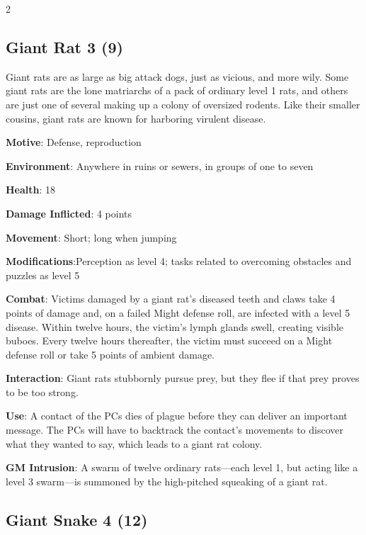 \begin{multicols}{2}
\subsection{Giant Rat	3 (9)}

Giant rats are as large as big attack dogs, just as vicious, and more wily. Some giant rats are the lone matriarchs of a pack of ordinary level 1 rats, and others are just one of several making up a colony of oversized rodents. Like their smaller cousins, giant rats are known for harboring virulent disease.

\textbf{Motive}: Defense, reproduction

\textbf{Environment}: Anywhere in ruins or sewers, in groups of one to seven 

\textbf{Health}: 18

\textbf{Damage Inflicted}: 4 points

\textbf{Movement}: Short; long when jumping

\textbf{Modifications}:Perception as level 4; tasks related to overcoming obstacles and puzzles as level 5

\textbf{Combat}: Victims damaged by a giant rat’s diseased teeth and claws take 4 points of damage and, on a failed Might defense roll, are infected with a level 5 disease. Within twelve hours, the victim’s lymph glands swell, creating visible buboes. Every twelve hours thereafter, the victim must succeed on a Might defense roll or take 5 points of ambient damage.

\textbf{Interaction}: Giant rats stubbornly pursue prey, but they flee if that prey proves to be too strong.

\textbf{Use}: A contact of the PCs dies of plague before they can deliver an important message. The PCs will have to backtrack the contact’s movements to discover what they wanted to say, which leads to a giant rat colony.

\textbf{GM Intrusion}: A swarm of twelve ordinary rats—each level 1, but acting like a level 3 swarm—is summoned by the high-pitched squeaking of a giant rat.

\subsection{Giant Snake 4 (12)}


\end{multicols}
